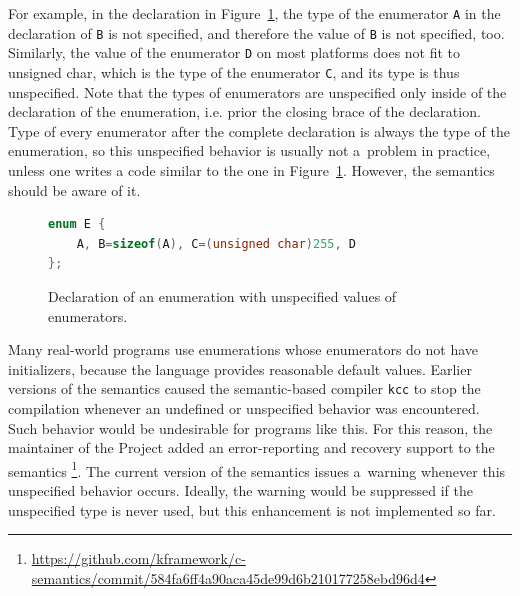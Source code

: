 \documentclass[nolot,nolof,nocover,printed]{fithesis3}
\newcommand{\kcc}{\texttt{kcc}\xspace}
\begin{document}
For example, in the declaration in Figure~\ref{fig:ugly-enum}, the type of the enumerator \lstinline|A| in the declaration of \lstinline|B| is not specified, and therefore the value of \lstinline|B| is not specified, too. Similarly, the value of the enumerator \lstinline|D| on most platforms does not fit to unsigned char, which is the type of the enumerator \lstinline|C|, and its type is thus unspecified. Note that the types of enumerators are unspecified only inside of the declaration of the enumeration, i.e. prior the closing brace of the declaration. Type of every enumerator after the complete declaration is always the type of the enumeration, so this unspecified behavior is usually not a~problem in practice, unless one writes a code similar to the one in Figure~\ref{fig:ugly-enum}. However, the semantics should be aware of it.

\begin{figure}[t]
\begin{lstlisting}[language=C++]
enum E {
	A, B=sizeof(A), C=(unsigned char)255, D
};
\end{lstlisting}
\caption{Declaration of an enumeration with unspecified values of enumerators.}
\label{fig:ugly-enum}
\end{figure}

Many real-world programs use enumerations whose enumerators do not have initializers, because the language provides reasonable default values. Earlier versions of the semantics caused the semantic-based compiler \kcc to stop the compilation whenever an undefined or unspecified behavior was encountered. Such behavior would be undesirable for programs like this. For this reason, the maintainer of the Project added an error-reporting and recovery support to the semantics \footnote{\url{https://github.com/kframework/c-semantics/commit/584fa6ff4a90aca45de99d6b210177258ebd96d4}}. The current version of the semantics issues a~warning whenever this unspecified behavior occurs. Ideally, the warning would be suppressed if the unspecified type is never used, but this enhancement is not implemented so far.


\end{document}
